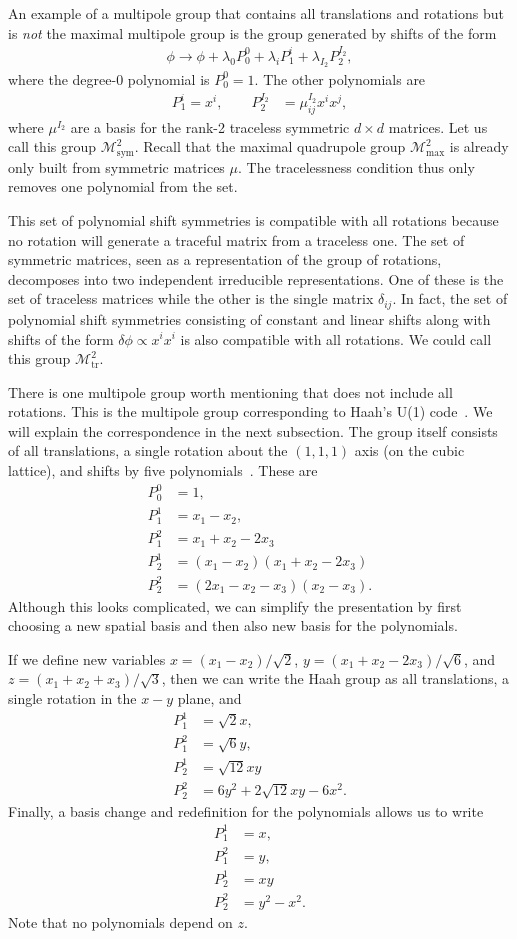 \documentclass[pra,aps,twocolumn, amsfonts,amsmath,amssymb,nofootinbib,superscriptaddress]{revtex4-2}
\newcommand{\nn}{\nonumber\\}
\newcommand{\goesto}{\rightarrow}
\begin{document}
An example of a multipole group that contains all translations and rotations but is \emph{not} the maximal multipole group is the group generated by shifts of the form
\begin{align}
\phi \goesto \phi + \lambda_0 P_0^0 + \lambda_{i} P^{i}_1 + \lambda_{I_2} P^{I_2}_2,
\end{align}
where the degree-0 polynomial is $P_0^0=1$. The other polynomials are
\begin{align}
P_1^{i} = x^i,\quad \quad P_2^{I_2} &= \mu^{I_2}_{ij} x^i x^j,
\end{align}
where $\mu^{I_2}$ are a basis for the rank-2 traceless symmetric $d\times d$ matrices. Let us call this group $\mathcal{M}^2_{\text{sym}}$. Recall that the maximal quadrupole group $\mathcal{M}^2_{\text{max}}$ is already only built from symmetric matrices $\mu$. The tracelessness condition thus only removes one polynomial from the set. 

This set of polynomial shift symmetries is compatible with all rotations because no rotation will generate a traceful matrix from a traceless one. The set of symmetric matrices, seen as a representation of the group of rotations, decomposes into two independent irreducible representations. One of these is the set of traceless matrices while the other is the single matrix $\delta_{ij}$. In fact, the set of polynomial shift symmetries consisting of constant and linear shifts along with shifts of the form $\delta \phi \propto x^ix^i$ is also compatible with all rotations. We could call this group $\mathcal{M}^2_\text{tr}$.

There is one multipole group worth mentioning that does not include all rotations. This is the multipole group corresponding to Haah's U(1) code~\cite{Haah2017, BB, Gromov2019}. We will explain the correspondence in the next subsection. The group itself consists of all translations, a single rotation about the $(1,1,1)$ axis (on the cubic lattice), and shifts by five polynomials~\cite{Gromov2019}. These are
\begin{align}
P_0^0 &= 1, \nn
P_1^1 &= x_1 - x_2,\nn
P_1^2 &= x_1 + x_2 - 2x_3\nn
P_2^1 &= (x_1 - x_2) (x_1 + x_2 - 2x_3)\nn
P_2^2 &= (2x_1 - x_2 - x_3) (x_2 - x_3).
\end{align}
Although this looks complicated, we can simplify the presentation by first choosing a new spatial basis and then also new basis for the polynomials.

If we define new variables $x = (x_1 - x_2)/\sqrt{2}$, $y = (x_1 + x_2 - 2x_3)/\sqrt{6}$, and $z = (x_1 + x_2 + x_3)/\sqrt{3}$, then we can write the Haah group as all translations, a single rotation in the $x-y$ plane, and
\begin{align}
P_1^1 &= \sqrt{2} x , \nn
P_1^2 &= \sqrt{6} y, \nn
P_2^1 &= \sqrt{12} xy\nn
P_2^2 &= 6y^2 +2\sqrt{12} xy - 6x^2.
\end{align}
Finally, a basis change and redefinition for the polynomials allows us to write
\begin{align}
P_1^1 &= x , \nn
P_1^2 &= y, \nn
P_2^1 &= xy\nn
P_2^2 &= y^2 - x^2.
\end{align}
Note that no polynomials depend on $z$.
\end{document}
